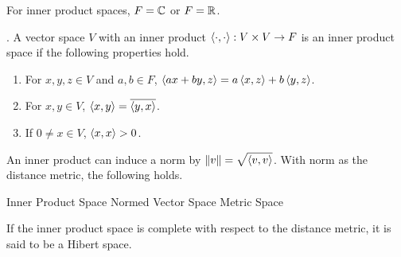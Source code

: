 \medskip

For inner product spaces, \(F = \mathbb{C}\) or \(F = \mathbb{R}\).

.  A vector space \(V\) with an inner product \(\left\langle \cdot, \cdot \right\rangle: V \times V \rightarrow F\) is an inner product space if the following properties hold.
\begin{enumerate}
    \item {} For \(x, y, z \in V\) and \(a, b \in F\), \(\left\langle ax + by, z \right\rangle = a\left\langle x, z \right\rangle + b\left\langle y, z \right\rangle\).
    \item {} For \(x, y \in V\), \(\left\langle x, y \right\rangle = \overline{\left\langle y, x \right\rangle}\).
    \item {} If \(0 \neq x \in V\), \(\left\langle x, x \right\rangle > 0\).
\end{enumerate}

\rmk An inner product can induce a norm by \(\displaystyle \left\lVert v \right\rVert = \sqrt{\left\langle v, v \right\rangle}\). With norm as the distance metric, the following holds.
\begin{center}
    Inner Product Space \mimp Normed Vector Space \mimp Metric Space
\end{center}
If the inner product space is complete with respect to the distance metric, it is said to be a Hibert space.
